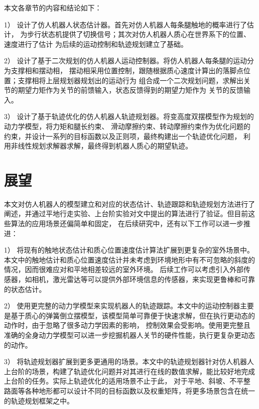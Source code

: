 本文各章节的内容和结论如下：

1） 设计了仿人机器人状态估计器。首先对仿人机器人每条腿触地的概率进行了估计，
为步行状态机提供了切换信号；其次对仿人机器人质心在世界系下的位置、速度进行了估计
为后续的运动控制和轨迹规划建立了基础。

2） 设计了基于二次规划的仿人机器人运动控制器。将仿人机器人每条腿的运动分为支撑相和摆动相，
摆动相采用位置控制，跟随根据质心速度计算出的落脚点位置；支撑相将上层规划器规划出的运动行为
组合成一个二次规划问题，求解出关节的期望力矩作为关节的前馈输入，状态反馈得到的期望力矩作为
关节的反馈输入。

3） 设计了基于轨迹优化的仿人机器人轨迹规划器。将变高度双摆模型作为规划的动力学模型，将力矩和腿长约束、
滑动摩擦约束、转动摩擦约束作为优化问题的约束，并设计一系列的目标函数以及正则项，最终构建出一个轨迹优化问题，
利用非线性规划求解器求解，最终得到机器人质心的期望轨迹。
\section{展望}
本文对仿人机器人的模型建立和对应的状态估计、轨迹跟踪和轨迹规划方法进行了阐述，并通过平地行走实验、上台阶实验对文中提出的算法进行了验证。但目前这些算法的应用场景还偏简单和固定，
在后续研究中，还有以下工作可以进一步推进：

1） 将现有的触地状态估计和质心位置速度估计算法扩展到更复杂的室外场景中。本文中的触地估计和质心位置速度估计并未考虑到环境地形中有不可忽略的斜度的情况，因而很难应对和平地相差较远的室外环境。
后续工作可以考虑引入外部传感器，如相机，激光雷达等可以提供外部环境信息的传感器，来实现更鲁棒和可靠的状态估计。

2） 使用更完整的动力学模型来实现机器人的轨迹跟踪。本文中的运动控制器主要是基于质心的弹簧倒立摆模型，该模型简单可靠便于快速求解，但在执行更动态的动作时，由于忽略了很多动力学因素的影响，
控制效果会受影响。使用更完整且准确的全身动力学模型可以进一步挖掘机器人关节的硬件性能，执行更复杂更动态的动作。

3） 将轨迹规划器扩展到更多更通用的场景。本文中的轨迹规划器针对仿人机器人上台阶的场景，构建了轨迹优化问题并对其进行在线的数值求解，能比较好地完成上台阶的任务。实际上轨迹优化的适用场景不止于此，
对于平地、斜坡、不平整路面等各种地形都可以设计不同的目标函数以及权重矩阵，将更多场景包含在统一的轨迹规划框架之中。